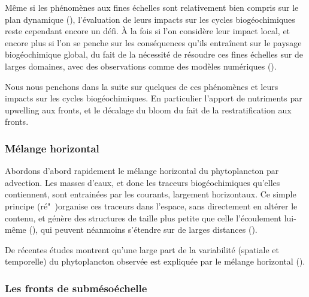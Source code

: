 
Même si les phénomènes aux fines échelles sont relativement bien compris sur le plan dynamique (\cite{mcwilliams_2016,mcwilliams_2019,gula_2022,taylor_2023}), l'évaluation de leurs impacts sur les cycles biogéochimiques reste cependant encore un défi.
À la fois si l'on considère leur impact local, et encore plus si l'on se penche sur les conséquences qu'ils entraînent sur le paysage biogéochimique global, du fait de la nécessité de résoudre ces fines échelles sur de larges domaines, avec des observations comme des modèles numériques (\cite{fox-kemper_2019,levy_2023}).

Nous nous penchons dans la suite sur quelques de ces phénomènes et leurs impacts sur les cycles biogéochimiques.
En particulier l'apport de nutriments par upwelling aux fronts, et le décalage du bloom du fait de la restratification aux fronts.

\subsubsection{Mélange horizontal}

Abordons d'abord rapidement le mélange horizontal du phytoplancton par advection.
Les masses  d'eaux, et donc les traceurs biogéochimiques qu'elles contiennent, sont entrainées par les courants, largement horizontaux.
Ce simple principe (ré"~)organise ces traceurs dans l'espace, sans directement en altérer le contenu, et génère des structures de taille plus petite que celle l'écoulement lui-même  (\cite{abraham_1998,lehahn_2007,dovidio_2010,levy_2018}), qui peuvent néanmoins s'étendre sur de larges distances (\cite{sergi_2020}).

De récentes études montrent qu'une large part de la variabilité (spatiale et temporelle) du phytoplancton observée est expliquée par le mélange horizontal (\cite{glover_2018,keerthi_2022,jonsson_2023}).



\subsubsection{Les fronts de submésoéchelle}

